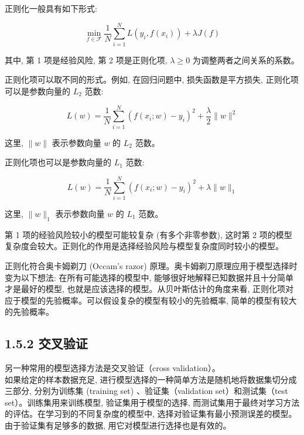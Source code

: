 \documentclass[10pt]{article}
\begin{document}
正则化一般具有如下形式:


\begin{equation*}
\min _{f \in \mathcal{F}} \frac{1}{N} \sum_{i=1}^{N} L\left(y_{i}, f\left(x_{i}\right)\right)+\lambda J(f) \tag{1.24}
\end{equation*}


其中, 第 1 项是经验风险, 第 2 项是正则化项, $\lambda \geqslant 0$ 为调整两者之间关系的系数。

正则化项可以取不同的形式。例如, 在回归问题中, 损失函数是平方损失, 正则化项可以是参数向量的 $L_{2}$ 范数:


\begin{equation*}
L(w)=\frac{1}{N} \sum_{i=1}^{N}\left(f\left(x_{i} ; w\right)-y_{i}\right)^{2}+\frac{\lambda}{2}\|w\|^{2} \tag{1.25}
\end{equation*}


这里, $\|w\|$ 表示参数向量 $w$ 的 $L_{2}$ 范数。

正则化项也可以是参数向量的 $L_{1}$ 范数:


\begin{equation*}
L(w)=\frac{1}{N} \sum_{i=1}^{N}\left(f\left(x_{i} ; w\right)-y_{i}\right)^{2}+\lambda\|w\|_{1} \tag{1.26}
\end{equation*}


这里, $\|w\|_{1}$ 表示参数向量 $w$ 的 $L_{1}$ 范数。

第 1 项的经验风险较小的模型可能较复杂 (有多个非零参数), 这时第 2 项的模型复杂度会较大。正则化的作用是选择经验风险与模型复杂度同时较小的模型。

正则化符合奥卡姆剃刀 (Occam's razor) 原理。奥卡姆剃刀原理应用于模型选择时变为以下想法: 在所有可能选择的模型中, 能够很好地解释已知数据并且十分简单才是最好的模型, 也就是应该选择的模型。从贝叶斯估计的角度来看, 正则化项对应于模型的先验概率。可以假设复杂的模型有较小的先验概率, 简单的模型有较大的先验概率。

\subsection*{1.5.2 交叉验证}
另一种常用的模型选择方法是交叉验证（cross validation）。\\
如果给定的样本数据充足, 进行模型选择的一种简单方法是随机地将数据集切分成三部分, 分别为训练集 (training set) 、验证集（validation set）和测试集（test set）。训练集用来训练模型, 验证集用于模型的选择, 而测试集用于最终对学习方法的评估。在学习到的不同复杂度的模型中, 选择对验证集有最小预测误差的模型。由于验证集有足够多的数据, 用它对模型进行选择也是有效的。
\end{document}
